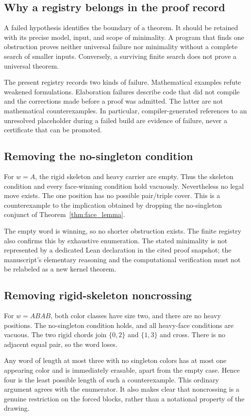 \documentclass[11pt,reqno]{amsart}
\theoremstyle{definition}
\begin{document}
\subsection{Why a registry belongs in the proof record}
A failed hypothesis identifies the boundary of a theorem. It should be retained
with its precise model, input, and scope of minimality. A program that finds
one obstruction proves neither universal failure nor minimality without a
complete search of smaller inputs. Conversely, a surviving finite search
does not prove a universal theorem.

The present registry records two kinds of failure. Mathematical examples
refute weakened formulations. Elaboration failures describe code that did
not compile and the corrections made before a proof was admitted. The latter
are not mathematical counterexamples. In particular, compiler-generated
references to an unresolved placeholder during a failed build are evidence
of failure, never a certificate that can be promoted.

\subsection{Removing the no-singleton condition}
For $w=A$, the rigid skeleton and heavy carrier are empty. Thus the skeleton
condition and every face-winning condition hold vacuously. Nevertheless no
legal move exists. The one position has no possible pair/triple cover.
This is a counterexample to the implication obtained by dropping the
no-singleton conjunct of Theorem~\ref{thm:face_lemma}.

The empty word is winning, so no shorter obstruction exists. The finite
registry also confirms this by exhaustive enumeration. The stated minimality
is not represented by a dedicated Lean declaration in the cited proof
snapshot; the manuscript's elementary reasoning and the computational
verification must not be relabeled as a new kernel theorem.

\subsection{Removing rigid-skeleton noncrossing}
For $w=ABAB$, both color classes have size two, and there are no heavy
positions. The no-singleton condition holds, and all heavy-face conditions
are vacuous. The two rigid chords join $\{0,2\}$ and $\{1,3\}$ and cross.
There is no adjacent equal pair, so the word loses.

Any word of length at most three with no singleton colors has at most one
appearing color and is immediately erasable, apart from the empty case.
Hence four is the least possible length of such a counterexample. This
ordinary argument agrees with the enumerator. It also makes clear that
noncrossing is a genuine restriction on the forced blocks, rather than a
notational property of the drawing.
\end{document}
